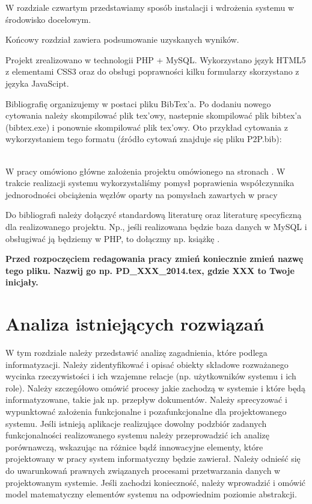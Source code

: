 \documentclass[10pt,titlepage]{article}
\newcommand{\PRZYKLAD}[1]{\par \noindent{\color{blue}PRZYKŁAD:}\\ {\color{szary}#1}\par}
\begin{document}
{W rozdziale czwartym przedstawiamy sposób instalacji i wdrożenia systemu w środowisko docelowym.

Końcowy rozdział zawiera  podsumowanie uzyskanych wyników.\\

\par


Projekt zrealizowano w technologii PHP + MySQL. 
Wykorzystano język HTML5 z elementami CSS3 
oraz do obsługi poprawności kilku formularzy skorzystano z języka JavaScipt.
}

Bibliografię organizujemy w postaci pliku BibTex'a. 
Po dodaniu nowego cytowania należy skompilować plik tex'owy, nastepnie skompilować plik bibtex'a (bibtex.exe) i ponownie
skompilować plik tex'owy.  
Oto przykład cytowania z wykorzystaniem tego formatu
(źródło cytowań znajduje się pliku P2P.bib):

\PRZYKLAD{
W pracy \cite{Chord2002} omówiono główne założenia projektu omówionego na stronach \cite{ChordProject}.
W trakcie realizacji systemu wykorzystaliśmy pomysł poprawienia współczynnika jednorodności obciążenia węzłów 
oparty na pomysłach zawartych w pracy \cite{JCIRandom}  
}

Do bibliografi należy dołączyć standardową literaturę oraz literaturę specyficzną dla realizowanego projektu.
Np., jeśli realizowana będzie baza danych w MySQL i obsługiwać ją będziemy w PHP, to dołączmy np. książkę 
\cite{converse2004php5}. 

\par
\textbf{Przed rozpoczęciem redagowania pracy zmień koniecznie zmień nazwę tego pliku. 
Nazwij go np. PD\_XXX\_2014.tex, gdzie XXX to Twoje inicjały.
}

\section{Analiza istniejących rozwiązań}

W tym rozdziale należy przedstawić analizę zagadnienia, które podlega informatyzacji. 
Należy zidentyfikować i opisać obiekty składowe rozważanego wycinka rzeczywistości i ich 
wzajemne relacje (np. użytkowników systemu i ich role). 
Należy szczegółowo omówić procesy jakie zachodzą w systemie i które będą informatyzowane, takie jak np. przepływ dokumentów.
Należy sprecyzować i wypunktować założenia funkcjonalne i pozafunkcjonalne dla projektowanego systemu.
Jeśli istnieją aplikacje realizujące dowolny podzbiór zadanych funkcjonalności realizowanego systemu 
należy przeprowadzić ich analizę porównawczą, wskazując na różnice bądź innowacyjne elementy, 
które projektowany w pracy system informatyczny będzie zawierał.
Należy odnieść się do uwarunkowań prawnych związanych procesami przetwarzania danych w projektowanym systemie.
Jeśli zachodzi konieczność, należy wprowadzić i omówić model matematyczny elementów systemu na odpowiednim poziomie abstrakcji.
\end{document}
